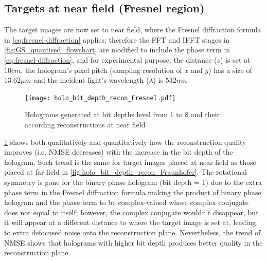 \subsection{Targets at near field (Fresnel region)}
	The target images are now set to near field, where the Fresnel diffraction formula in \cref{eq:fresnel-diffraction} applies; therefore the FFT and IFFT stages in \cref{fig:GS_quantised_flowchart} are modified to include the phase term in \cref{eq:fresnel-diffraction}, and for experimental purpose, the distance ($z$) is set at $10cm$, the hologram's pixel pitch (sampling resolution of $x$ and $y$) has a size of $13.62\mu m$ and the incident light's wavelength ($\lambda$) is $532nm$.
	\begin{figure} [H]
	   \begin{center}
	   \texttt{[image: holo\_bit\_depth\_recon\_Fresnel.pdf]}
	   \end{center}
	   \caption{\label{fig:holo_bit_depth_recon_Fresnel} Holograms generated at bit depths level from 1 to 8 and their according reconstructions at near field}
	\end{figure}

	\cref{fig:holo_bit_depth_recon_Fresnel} shows both qualitatively and quantitatively how the reconstruction quality improves (i.e. NMSE decreases) with the increase in the bit depth of the hologram. Such trend is the same for target images placed at near field as those placed at far field in \cref{fig:holo_bit_depth_recon_Fraunhofer}. The rotational symmetry is gone for the binary phase hologram (bit depth = 1) due to the extra phase term in the Fresnel diffraction formula making the product of binary phase hologram and the phase term to be complex-valued whose complex conjugate does not equal to itself; however, the complex conjugate wouldn't disappear, but it will appear at a different distance to where the target image is set at, leading to extra defocused noise onto the reconstruction plane. Nevertheless, the trend of NMSE shows that holograms with higher bit depth produces better quality in the reconstruction plane.

